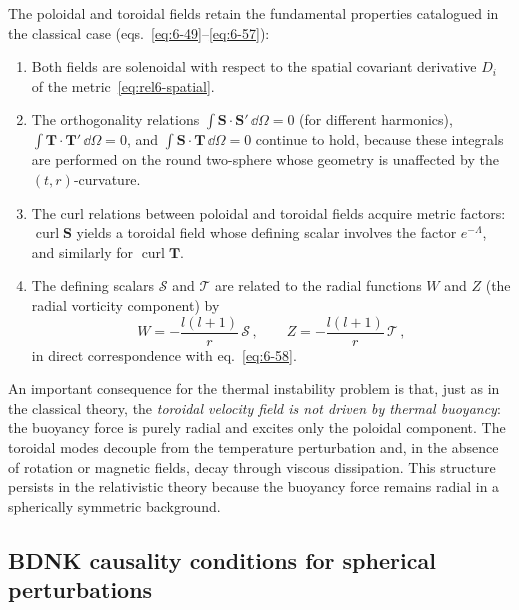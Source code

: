 The poloidal and toroidal fields retain the fundamental properties
catalogued in the classical case (eqs.~\eqref{eq:6-49}--\eqref{eq:6-57}):
\begin{enumerate}
\item[(i)] Both fields are solenoidal with respect to the spatial
  covariant derivative $D_{i}$ of the metric~\eqref{eq:rel6-spatial}.

\item[(ii)] The orthogonality relations
  $\int \mathbf{S}\cdot\mathbf{S}'\,\dd\Omega = 0$ (for different
  harmonics), $\int \mathbf{T}\cdot\mathbf{T}'\,\dd\Omega = 0$, and
  $\int \mathbf{S}\cdot\mathbf{T}\,\dd\Omega = 0$ continue to hold,
  because these integrals are performed on the round two-sphere whose
  geometry is unaffected by the $(t,r)$-curvature.

\item[(iii)] The curl relations between poloidal and toroidal fields
  acquire metric factors: $\operatorname{curl}\mathbf{S}$ yields a
  toroidal field whose defining scalar involves the factor
  $e^{-\Lambda}$, and similarly for
  $\operatorname{curl}\mathbf{T}$.

\item[(iv)] The defining scalars $\mathscr{S}$ and $\mathscr{T}$ are
  related to the radial functions $W$ and $Z$ (the radial vorticity
  component) by
  \begin{equation}
    W = -\frac{l(l+1)}{r}\,\mathscr{S}\,, \qquad
    Z = -\frac{l(l+1)}{r}\,\mathscr{T}\,,
    \label{eq:rel6-WZ-ST}
  \end{equation}
  in direct correspondence with eq.~\eqref{eq:6-58}.
\end{enumerate}

\noindent
An important consequence for the thermal instability problem is that,
just as in the classical theory, the \emph{toroidal velocity field
is not driven by thermal buoyancy}: the buoyancy force is purely radial
and excites only the poloidal component.  The toroidal modes decouple
from the temperature perturbation and, in the absence of rotation or
magnetic fields, decay through viscous dissipation.  This structure
persists in the relativistic theory because the buoyancy force remains
radial in a spherically symmetric background.

\subsection{BDNK causality conditions for spherical perturbations}
\label{subsec:rel-56-causality}

